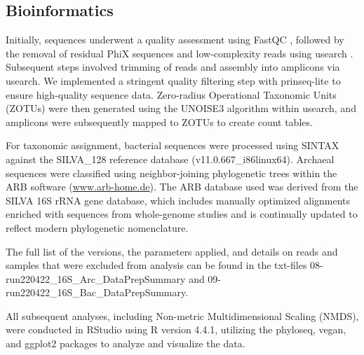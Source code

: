 \subsection{Bioinformatics}
Initially, sequences underwent a quality assessment using FastQC \citep{andrews2010fastqc}, followed by the removal of residual PhiX sequences and low-complexity reads using usearch \citep{edgar2016unoise2}.
Subsequent steps involved trimming of reads and assembly into amplicons via usearch.
We implemented a stringent quality filtering step with prinseq-lite to ensure high-quality sequence data.
Zero-radius Operational Taxonomic Units (ZOTUs) were then generated using the UNOISE3 algorithm within usearch, and amplicons were subsequently mapped to ZOTUs to create count tables.

For taxonomic assignment, bacterial sequences were processed using SINTAX against the SILVA\_128 reference database (v11.0.667\_i86linux64).
Archaeal sequences were classified using neighbor-joining phylogenetic trees within the ARB software (\url{www.arb-home.de}).
The ARB database used was derived from the SILVA 16S rRNA gene database, which includes manually optimized alignments enriched with sequences from whole-genome studies and is continually updated to reflect modern phylogenetic nomenclature.

\sloppy
The full list of the versions, the parameters applied, and details on reads and samples that were excluded from analysis can be found in the txt-files 08-run220422\_16S\_Arc\_DataPrepSummary and 09-run220422\_16S\_Bac\_DataPrepSummary.
\sloppy

All subsequent analyses, including Non-metric Multidimensional Scaling (NMDS), were conducted in RStudio using R version 4.4.1, utilizing the phyloseq, vegan, and ggplot2 packages to analyze and visualize the data.
\newpage

\FloatBarrier %


\clearpage

